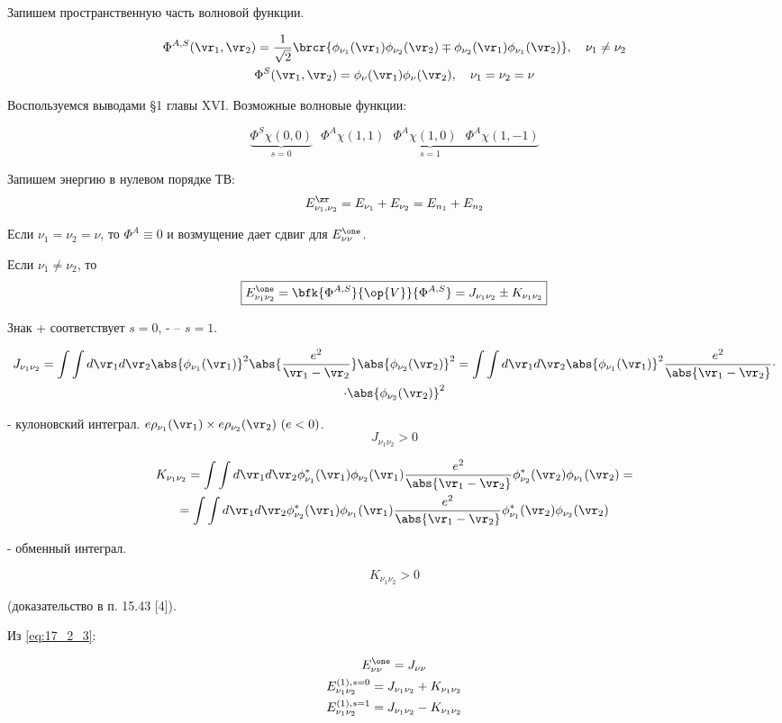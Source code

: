 Запишем пространственную часть волновой функции.

\begin{gather}
\label{eq:17_2_1}
\Phi^{A, S}(\vr_1, \vr_2) = \frac{1}{\sqrt{2}}\brcr{\phi_{\nu_1}(\vr_1) \phi_{\nu_2}(\vr_2) \mp \phi_{\nu_2}(\vr_1) \phi_{\nu_1}(\vr_2)}, ~~~\nu_1 \not = \nu_2 \nonumber \\
\Phi^S(\vr_1, \vr_2) = \phi_{\nu}(\vr_1) \phi_{\nu}(\vr_2), ~~~\nu_1 = \nu_2= \nu
\end{gather}

Воспользуемся выводами \S 1 главы XVI. Возможные волновые функции:

\begin{equation}
\label{eq:17_2_2}
\underbrace{\Phi^S \chi(0, 0)}_{s = 0}~~~\underbrace{\Phi^A \chi(1,1)~~~\Phi^A \chi(1,0)~~~\Phi^A \chi(1,-1)}_{s = 1}
\end{equation}

Запишем энергию в нулевом порядке ТВ:
$$
E_{\nu_1, \nu_2}^\zr = E_{\nu_1} + E_{\nu_2} = E_{n_1} + E_{n_2}
$$

Если  $\nu_1 = \nu_2= \nu$, то $\Phi^A \equiv 0$ и возмущение дает сдвиг для $E_{\nu \nu}^\one$.

Если  $\nu_1 \not = \nu_2$, то
\begin{equation}
\label{eq:17_2_3}
\boxed{E_{\nu_1 \nu_2}^\one = \bfk{\Phi^{A, S}}{\op{V}}{\Phi^{A, S}} = J_{\nu_1 \nu_2} \pm K_{\nu_1 \nu_2}} 
\end{equation}

Знак + соответствует $s = 0$, - -- $s = 1$.

\begin{gather}
\label{eq:17_2_4}
J_{\nu_1 \nu_2} = \int \int d\vr_1 d\vr_2 \abs{\phi_{\nu_1}(\vr_1)}^2 \abs{\frac{e^2}{\vr_1 - \vr_2}} \abs{\phi_{\nu_2}(\vr_2)}^2 = \int \int d\vr_1 d\vr_2 \abs{\phi_{\nu_1}(\vr_1)}^2 \frac{e^2}{\abs{\vr_1 - \vr_2}} \cdot \nonumber \\ \cdot \abs{\phi_{\nu_2}(\vr_2)}^2
\end{gather}

- кулоновский интеграл. $e\rho_{\nu_1}(\vr_1) \times e\rho_{\nu_2}(\vr_2)~(e < 0)$.
$$
J_{\nu_1 \nu_2} > 0
$$

\begin{gather}
\label{eq:17_2_5}
K_{\nu_1 \nu_2} = \int \int d\vr_1 d\vr_2 \phi^*_{\nu_1}(\vr_1) \phi_{\nu_2}(\vr_1)\frac{e^2}{\abs{\vr_1 - \vr_2}}  \phi^*_{\nu_2}(\vr_2) \phi_{\nu_1}(\vr_2) = \nonumber \\
= \int \int d\vr_1 d\vr_2 \phi^*_{\nu_2}(\vr_1) \phi_{\nu_1}(\vr_1)\frac{e^2}{\abs{\vr_1 - \vr_2}}  \phi^*_{\nu_1}(\vr_2) \phi_{\nu_2}(\vr_2)
\end{gather}

- обменный интеграл.

$$
K_{\nu_1 \nu_2} > 0
$$

(доказательство в п. 15.43 [4]).

Из \eqref{eq:17_2_3}:

\begin{gather*}
E_{\nu\nu}^\one = J_{\nu\nu} \\
E_{\nu_1 \nu_2}^{(1), s=0} = J_{\nu_1\nu_2} + K_{\nu_1\nu_2} \\
E_{\nu_1 \nu_2}^{(1), s=1} = J_{\nu_1\nu_2} - K_{\nu_1\nu_2} 
\end{gather*}